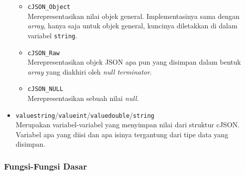 \begin{itemize}
\begin{itemize}
		\item \verb|cJSON_Object|\\
		Merepresentasikan nilai objek general. Implementasinya sama dengan \textit{array}, hanya saja untuk objek general, kuncinya diletakkan di dalam variabel \verb|string|.
		\item \verb|cJSON_Raw|\\
		Merepresentasikan objek JSON apa pun yang disimpan dalam bentuk \textit{array} yang diakhiri oleh \textit{null terminator}.
		\item \verb|cJSON_NULL|\\
		Merepresentasikan sebuah nilai \textit{null}.
	\end{itemize}
	
	\item \verb|valuestring|/\verb|valueint|/\verb|valuedouble|/\verb|string|\\	
	Merupakan variabel-variabel yang menyimpan nilai dari struktur cJSON. Variabel apa yang diisi dan apa isinya tergantung dari tipe data yang disimpan.
\end{itemize}

\subsubsection{Fungsi-Fungsi Dasar}
\label{sec:cmodules-cJSON-basicfuncts}

